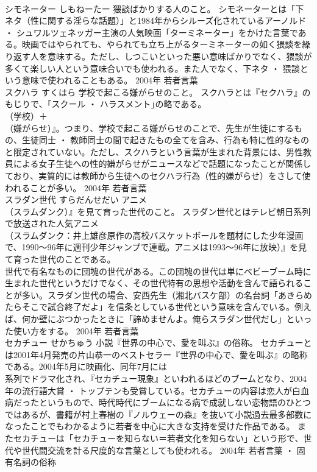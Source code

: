 \documentclass[8pt]{extreport}
\begin{document}
\begin{CJK}{UTF8}{min}
\\	シモネーター	しもねーたー	猥談ばかりする人のこと。	シモネーターとは「下ネタ（性に関する淫らな話題）」と1984年からシルーズ化されているアーノルド ・ シュワルツェネッガー主演の人気映画「ターミネーター」をかけた言葉である。映画ではやられても、やられても立ち上がるターミネーターの如く猥談を繰り返す人を意味する。ただし、しつこいといった悪い意味ばかりでなく、猥談が多くて楽しい人という意味合いでも使われる。また人でなく、下ネタ ・ 猥談という意味で使われることもある。	2004年	若者言葉	
\\	スクハラ	すくはら	学校で起こる嫌がらせのこと。	スクハラとは『セクハラ』のもじりで、「スクール ・ ハラスメント｣の略である。
\\	（学校）＋
\\	（嫌がらせ）』。つまり、学校で起こる嫌がらせのことで、先生が生徒にするもの、生徒同士 ・ 教師同士の間で起きたもの全てを含み、行為も特に性的なものと限定されていない。ただし、スクハラという言葉が生まれた背景には、男性教員による女子生徒への性的嫌がらせがニュースなどで話題になったことが関係しており、実質的には教師から生徒へのセクハラ行為（性的嫌がらせ）をさして使われることが多い。	2004年	若者言葉	
\\	スラダン世代	すらだんせだい	アニメ
\\	（スラムダンク）』を見て育った世代のこと。	スラダン世代とはテレビ朝日系列で放送された人気アニメ
\\	（スラムダンク：井上雄彦原作の高校バスケットボールを題材にした少年漫画で、1990～96年に週刊少年ジャンプで連載。アニメは1993～96年に放映）』を見て育った世代のことである。
\\	世代で有名なものに団塊の世代がある。この団塊の世代は単にベビーブーム時に生まれた世代というだけでなく、その世代特有の思想や活動を含んで語られることが多い。スラダン世代の場合、安西先生（湘北バスケ部）の名台詞「あきらめたらそこで試合終了だよ」を信条としている世代という意味を含んでいる。例えば、何か壁にぶつかったときに「諦めませんよ。俺らスラダン世代だし」といった使い方をする。	2004年	若者言葉	
\\	セカチュー	せかちゅう	小説『世界の中心で、愛を叫ぶ』の俗称。	セカチューとは2001年4月発売の片山恭一のベストセラー『世界の中心で、愛を叫ぶ』の略称である。2004年5月に映画化、同年7月には
\\	系列でドラマ化され、『セカチュー現象』といわれるほどのブームとなり、2004年の流行語大賞 ・ トップテンも受賞している。セカチューの内容は恋人が白血病だったというもので、時代時代にブームになる病で成就しない恋物語のひとつではあるが、書籍が村上春樹の『ノルウェーの森』を抜いて小説過去最多部数になったことでもわかるように若者を中心に大きな支持を受けた作品である。 またセカチューは「セカチューを知らない＝若者文化を知らない」という形で、世代や世代間交流を計る尺度的な言葉としても使われる。	2004年	若者言葉 ・ 固有名詞の俗称	

\end{CJK}
\end{document}
